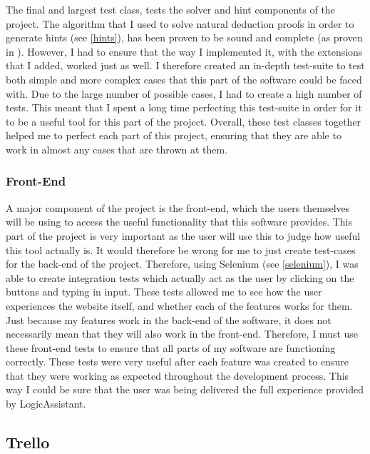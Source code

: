 The final and largest test class, tests the solver and hint components of the project. The algorithm that I used to solve natural deduction proofs in order to generate hints (see \ref{hints}), has been proven to be sound and complete (as proven in \cite{ndAlgo}). However, I had to ensure that the way I implemented it, with the extensions that I added, worked just as well. I therefore created an in-depth test-suite to test both simple and more complex cases that this part of the software could be faced with. Due to the large number of possible cases, I had to create a high number of tests. This meant that I spent a long time perfecting this test-suite in order for it to be a useful tool for this part of the project. Overall, these test classes together helped me to perfect each part of this project, ensuring that they are able to work in almost any cases that are thrown at them.

\subsubsection{Front-End}

A major component of the project is the front-end, which the users themselves will be using to access the useful functionality that this software provides. This part of the project is very important as the user will use this to judge how useful this tool actually is. It would therefore be wrong for me to just create test-cases for the back-end of the project. Therefore, using Selenium (see \ref{selenium}), I was able to create integration tests which actually act as the user by clicking on the buttons and typing in input. These tests allowed me to see how the user experiences the website itself, and whether each of the features works for them. Just because my features work in the back-end of the software, it does not necessarily mean that they will also work in the front-end. Therefore, I must use these front-end tests to ensure that all parts of my software are functioning correctly. These tests were very useful after each feature was created to ensure that they were working as expected throughout the development process. This way I could be sure that the user was being delivered the full experience provided by LogicAssistant.

\subsection{Trello \label{trello}}


